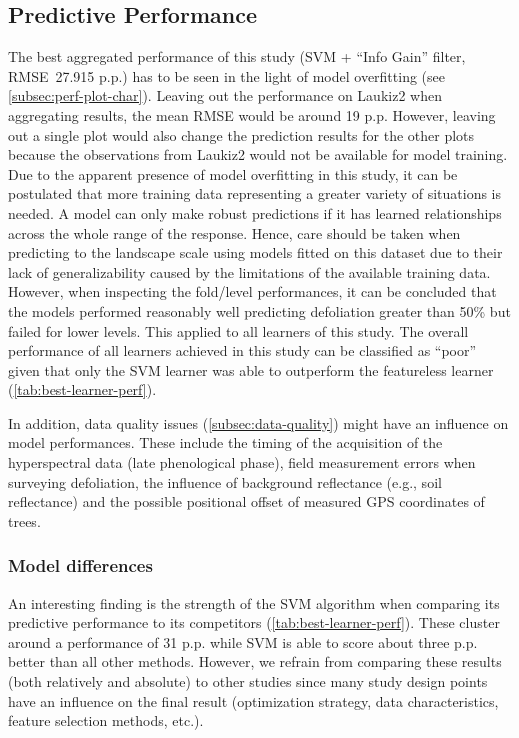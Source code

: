 \documentclass[remotesensing,article,submit,moreauthors,pdftex]{Definitions/mdpi}
\begin{document}
\subsection{Predictive Performance}

The best aggregated performance of this study (SVM + \enquote{Info Gain} filter, RMSE~27.915 p.p.) has to be seen in the light of model overfitting (see \autoref{subsec:perf-plot-char}).
Leaving out the performance on Laukiz2 when aggregating results, the mean RMSE would be around 19 p.p.
However, leaving out a single plot would also change the prediction results for the other plots because the observations from Laukiz2 would not be available for model training.
Due to the apparent presence of model overfitting in this study, it can be postulated that more training data representing a greater variety of situations is needed.
A model can only make robust predictions if it has learned relationships across the whole range of the response.
Hence, care should be taken when predicting to the landscape scale using models fitted on this dataset due to their lack of generalizability caused by the limitations of the available training data.
However, when inspecting the fold\-/level performances, it can be concluded that the models performed reasonably well predicting defoliation greater than 50\% but failed for lower levels.
This applied to all learners of this study.
The overall performance of all learners achieved in this study can be classified as ``poor'' given that only the SVM learner was able to outperform the featureless learner (\autoref{tab:best-learner-perf}).

In addition, data quality issues (\autoref{subsec:data-quality}) might have an influence on model performances.
These include the timing of the acquisition of the hyperspectral data (late phenological phase), field measurement errors when surveying defoliation, the influence of background reflectance (e.g., soil reflectance) and the possible positional offset of measured GPS coordinates of trees.

\subsubsection{Model differences}

An interesting finding is the strength of the SVM algorithm when comparing its predictive performance to its competitors (\autoref{tab:best-learner-perf}).
These cluster around a performance of 31 p.p. while SVM is able to score about three p.p. better than all other methods.
However, we refrain from comparing these results (both relatively and absolute) to other studies since many study design points have an influence on the final result (optimization strategy, data characteristics, feature selection methods, etc.).
\end{document}
